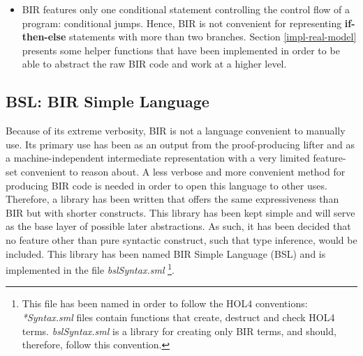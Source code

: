 \documentclass{kththesis}
\begin{document}
{\begin{itemize}
\begin{lstlisting}
  bb_last_statement := BStmt_Jmp (BLE_Label (BL_Label "alice_automaton.end"))                                                        
|>;                                                                                                                                  
\end{lstlisting}
    \item BIR features only one conditional statement controlling the control flow of a program: conditional jumps. Hence, BIR is not convenient for representing \textbf{if-then-else} statements with more than two branches. Section \ref{impl-real-model} presents some helper functions that have been implemented in order to be able to abstract the raw BIR code and work at a higher level.
\end{itemize}


\subsection{BSL: BIR Simple Language} \label{bsl}

Because of its extreme verbosity, BIR is not a language convenient to manually use. Its primary use has been as an output from the \gls{proof-producing} lifter and as a machine-independent intermediate representation with a very limited feature-set convenient to reason about. A less verbose and more convenient method for producing BIR code is needed in order to open this language to other uses. Therefore, a library has been written that offers the same expressiveness than BIR but with shorter constructs. This library has been kept simple and will serve as the base layer of possible later abstractions. As such, it has been decided that no feature other than pure syntactic construct, such that type inference, would be included. This library has been named BIR Simple Language (BSL) and is implemented in the file \textit{bslSyntax.sml} \footnote{This file has been named in order to follow the HOL4 conventions: \textit{*Syntax.sml} files contain functions that create, destruct and check HOL4 terms. \textit{bslSyntax.sml} is a library for creating only BIR terms, and should, therefore, follow this convention.}.

}
\end{document}
